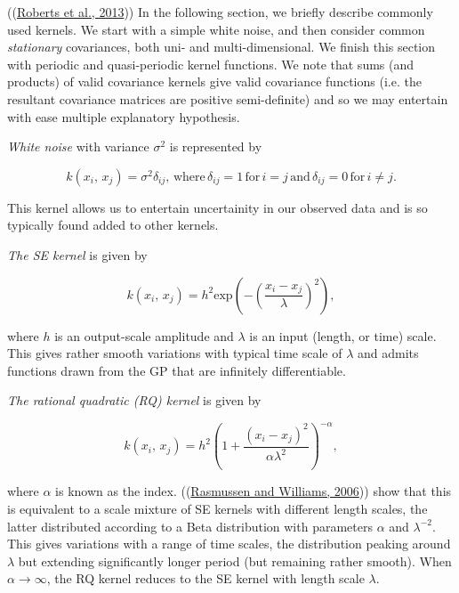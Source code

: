 \documentclass[a4paper, 10pt, fleqn]{article}
\begin{document}
\begin{flushleft}
   ((\hyperref[Roberts2013]{Roberts et al., 2013})) In the following section, we briefly describe commonly used kernels. We start with a simple white noise, and then consider common \textit{stationary} covariances, both uni- and multi-dimensional. We finish this section with periodic and quasi-periodic kernel functions. We note that sums (and products) of valid covariance kernels give valid covariance functions (i.e. the resultant covariance matrices are positive semi-definite) and so we may entertain with ease multiple explanatory hypothesis. 

   \vspace{1em}

   \textit{White noise} with variance $\sigma^2$ is represented by
   
   $$k(x_{i}, \, x_{j}) = \sigma^2\delta_{ij}, \, \text{where} \, \delta_{ij} = 1 \, \text{for} \, i = j \, \text{and} \, \delta_{ij} = 0 \, \text{for} \, i \neq j.$$

   This kernel allows us to entertain uncertainity in our observed data and is so typically found added to other kernels.

   \vspace{1em}

   \textit{The SE kernel} is given by

   $$k(x_{i}, \, x_{j}) = h^{2} \text{exp}(-(\frac{x_i - x_j}{\lambda})^2),$$ 

   where $h$ is an output-scale amplitude and $\lambda$ is an input (length, or time) scale. This gives rather smooth variations with typical time scale of $\lambda$ and admits functions drawn from the GP that are infinitely differentiable.

   \vspace{1em}

   \textit{The rational quadratic (RQ) kernel} is given by

   $$k(x_{i}, \, x_{j}) = h^{2} (1 + \frac{(x_{i} - x_{j})^2}{\alpha\lambda^2})^{-\alpha},$$

   where $\alpha$ is known as the index. ((\hyperref[Rasmussen2006]{Rasmussen and Williams, 2006})) show that this is equivalent to a scale mixture of SE kernels with different length scales, the latter distributed according to a Beta distribution with parameters $\alpha$ and $\lambda^{-2}$. This gives variations with a range of time scales, the distribution peaking around $\lambda$ but extending significantly longer period (but remaining rather smooth). When $\alpha \to \infty$, the RQ kernel reduces to the SE kernel with length scale $\lambda$.


\end{flushleft}
\end{document}
